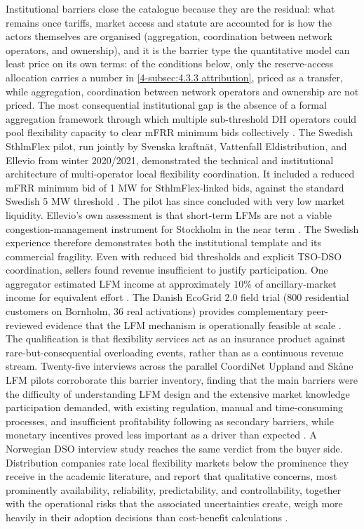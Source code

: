 Institutional barriers close the catalogue because they are the residual: what remains once tariffs, market access and statute are accounted for is how the actors themselves are organised (aggregation, coordination between network operators, and ownership), and it is the barrier type the quantitative model can least price on its own terms: of the conditions below, only the reserve-access allocation carries a number in \autoref{4-subsec:4.3.3 attribution}, priced as a transfer, while aggregation, coordination between network operators and ownership are not priced. The most consequential institutional gap is the absence of a formal aggregation framework through which multiple sub-threshold DH operators could pool flexibility capacity to clear mFRR minimum bids collectively \cite{sneum_barriers_2021}. The Swedish SthlmFlex pilot, run jointly by Svenska kraftnät, Vattenfall Eldistribution, and Ellevio from winter 2020/2021, demonstrated the technical and institutional architecture of multi-operator local flexibility coordination. It included a reduced mFRR minimum bid of 1 MW for SthlmFlex-linked bids, against the standard Swedish 5 MW threshold \cite{nyman_how_2026}. The pilot has since concluded with very low market liquidity. Ellevio's own assessment is that short-term LFMs are not a viable congestion-management instrument for Stockholm in the near term \cite{scrocca_local_2026}. The Swedish experience therefore demonstrates both the institutional template and its commercial fragility. Even with reduced bid thresholds and explicit TSO-DSO coordination, sellers found revenue insufficient to justify participation. One aggregator estimated LFM income at approximately $10\%$ of ancillary-market income for equivalent effort \cite{nyman_how_2026}. The Danish EcoGrid 2.0 field trial (800 residential customers on Bornholm, 36 real activations) provides complementary peer-reviewed evidence that the LFM mechanism is operationally feasible at scale \cite{heinrich_ecogrid_2020}. The qualification is that flexibility services act as an insurance product against rare-but-consequential overloading events, rather than as a continuous revenue stream. Twenty-five interviews across the parallel CoordiNet Uppland and Skåne LFM pilots corroborate this barrier inventory, finding that the main barriers were the difficulty of understanding LFM design and the extensive market knowledge participation demanded, with existing regulation, manual and time-consuming processes, and insufficient profitability following as secondary barriers, while monetary incentives proved less important as a driver than expected \cite{palm_drivers_2023}. A Norwegian DSO interview study reaches the same verdict from the buyer side. Distribution companies rate local flexibility markets below the prominence they receive in the academic literature, and report that qualitative concerns, most prominently availability, reliability, predictability, and controllability, together with the operational risks that the associated uncertainties create, weigh more heavily in their adoption decisions than cost-benefit calculations \cite{saele_understanding_2023}.

